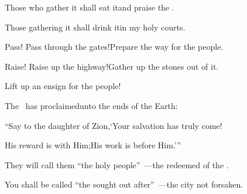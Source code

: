 \begin{inparaenum}
  \pc{} Those who gather it shall eat it\pa{}and praise the \lord.%

  \pd{}Those gathering it shall drink it\pa{}in my holy courts.%

  \pa{} Pass! Pass through the gates!\pa{}Prepare the way for the people.%

  \pb{}Raise! Raise up the highway!\pa{}Gather up the stones out of it.%

  \pb{}Lift up an ensign for the people!%

  \pa{} The \lord\ has proclaimed\pa{}unto the ends of the Earth:%

  \pb{}``Say to the daughter of Zion,\pa{}`Your salvation has truly come!%

  \pb{}His reward is with Him;\pa{}His work is before Him.'\thinspace''%

  \pa{} They will call them ``the holy people''~---\pa{}the redeemed of the \lord.%

  \pb{}You shall be called ``the sought out after''~---\pa{}the city not forsaken.%
\end{inparaenum}
